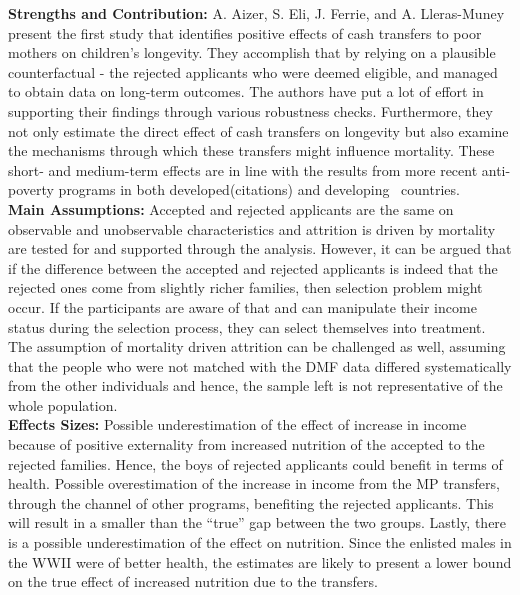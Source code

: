 \textbf{Strengths and Contribution:} A. Aizer, S. Eli, J. Ferrie, and A. Lleras-Muney present the first study that identifies positive effects of cash transfers to poor mothers on children's longevity. They accomplish that by relying on a plausible counterfactual - the rejected applicants who were deemed eligible, and managed to obtain data on long-term outcomes. The authors have put a lot of effort in supporting their findings through various robustness checks. Furthermore, they not only estimate the direct effect of cash transfers on longevity but also examine the mechanisms through which these transfers might influence mortality. These short- and medium-term effects are in line with the results from more recent anti-poverty programs in both developed(citations) and developing~\citep{barham2011healthier,barham2013living} countries. \\
\textbf{Main Assumptions:} Accepted and rejected applicants are the same on observable and unobservable characteristics and attrition is driven by mortality are tested for and supported through the analysis. However, it can be argued that if the difference between the accepted and rejected applicants is indeed that the rejected ones come from slightly richer families, then selection problem might occur. If the participants are aware of that and can manipulate their income status during the selection process, they can select themselves into treatment. The assumption of mortality driven attrition can be challenged as well, assuming that the people who were not matched with the DMF data differed systematically from the other individuals and hence, the sample left is not representative of the whole population. \\
\textbf{Effects Sizes:} Possible underestimation of the effect of increase in income because of positive
externality from increased nutrition of the accepted to the rejected families. Hence, the boys of rejected applicants could benefit in terms of health. Possible overestimation of the increase in income from the MP transfers, through the channel of other programs, benefiting the rejected applicants. This will result in a smaller than the ``true'' gap between the two groups. Lastly, there is a possible underestimation of the effect on nutrition. Since the enlisted males in the WWII were of better health, the estimates are likely to present a lower bound on the true effect of increased nutrition due to the transfers. \\

